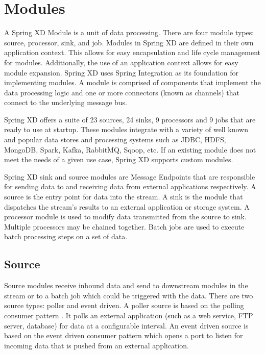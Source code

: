 \section{Modules}
\label{sec:Modules}
A Spring XD Module \cite{modules} is a unit of data processing. There are four module
types: source, processor, sink, and job. Modules in Spring XD are defined
in their own application context. This allows for easy encapsulation and life cycle
management for modules. Additionally, the use of an application context allows for easy
module expansion.  Spring XD uses Spring Integration \cite{spring-integration-reference}
as its foundation for implementing modules. A module is comprised of components that
implement the data processing logic and one or more connectors (known as channels)
that connect to the underlying message bus.

\par

Spring XD offers a suite of 23 sources, 24 sinks, 9 processors and 9 jobs that are ready
to use at startup.  These modules integrate with a variety of well known and popular
data stores and processing systems such as JDBC\cite{jdbc}, HDFS, MongoDB\cite{mongodb},
Spark, Kafka, RabbitMQ, Sqoop, etc.  If an existing module does not meet the needs of a
given use case, Spring XD supports custom modules.

Spring XD sink and source modules are Message Endpoints
\cite{enterprise-integration-pattern-message-endpoint}
that are responsible for sending data to and receiving data from external applications
respectively. A source is the entry point for data into the stream. A sink is
the module that dispatches the stream's results to an external application or storage system.
A processor module is used to modify data transmitted from the source to sink.
Multiple processors may be chained together. Batch jobs are used to execute batch
processing steps on a set of data.

\par

\subsection{Source}
\label{sec:Source}
Source modules receive inbound data and send to downstream modules in the stream or to a batch job
which could be triggered with the data. There are two source types: poller and event driven.
A poller source is based on the polling consumer pattern \cite{enterprise-integration-pattern-pollingconsumer}.
It polls an external application (such as a web service, FTP server, database) for data at a
configurable interval. An event driven source is based on the event driven
consumer pattern \cite{enterprise-integration-pattern-eventdrivenconsumer} which
opens a port to listen for incoming data that is pushed from an external application.

